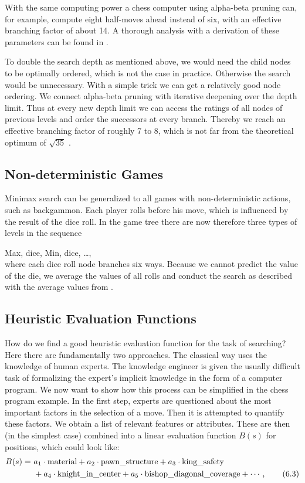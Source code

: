\documentclass[10pt]{book}
\begin{document}
With the same computing power a chess computer using alpha-beta pruning can, for example, compute eight half-moves ahead instead of six, with an effective branching factor of about 14. A thorough analysis with a derivation of these parameters can be found in \cite{pea84}.

To double the search depth as mentioned above, we would need the child nodes to be optimally ordered, which is not the case in practice. Otherwise the search would be unnecessary. With a simple trick we can get a relatively good node ordering. We connect alpha-beta pruning with iterative deepening over the depth limit. Thus at every new depth limit we can access the ratings of all nodes of previous levels and order the successors at every branch. Thereby we reach an effective branching factor of roughly 7 to 8, which is not far from the theoretical optimum of $\sqrt{35}$ \cite{Nil98}.

\subsection{Non-deterministic Games}
Minimax search can be generalized to all games with non-deterministic actions, such as backgammon. Each player rolls before his move, which is influenced by the result of the dice roll. In the game tree there are now therefore three types of levels in the sequence

Max, dice, Min, dice, \ldots,\\[0pt]
where each dice roll node branches six ways. Because we cannot predict the value of the die, we average the values of all rolls and conduct the search as described with the average values from \cite{RN10}.

\subsection{Heuristic Evaluation Functions}
How do we find a good heuristic evaluation function for the task of searching? Here there are fundamentally two approaches. The classical way uses the knowledge of human experts. The knowledge engineer is given the usually difficult task of formalizing the expert's implicit knowledge in the form of a computer program. We now want to show how this process can be simplified in the chess program example.
In the first step, experts are questioned about the most important factors in the selection of a move. Then it is attempted to quantify these factors. We obtain a list of relevant features or attributes. These are then (in the simplest case) combined into a linear evaluation function $B(s)$ for positions, which could look like:
\begin{align}
B(s)= &\ a_{1} \cdot \text{material}+a_{2} \cdot \text{pawn\_structure}+a_{3} \cdot \text{king\_safety} \notag\\
&\ +a_{4} \cdot \text{knight\_in\_center}+a_{5} \cdot \text{bishop\_diagonal\_coverage}+\cdots, \tag{6.3}
\end{align}
\end{document}
